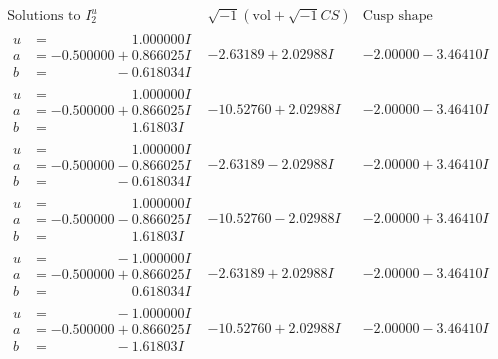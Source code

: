 \documentclass[1p]{elsarticle_modified}
\theoremstyle{definition}
\newcommand{\I}{\sqrt{-1}}
\begin{document}
$$\begin{array}{c|c|c}  
\text{Solutions to }I^u_{2}& \I (\text{vol} + \sqrt{-1}CS) & \text{Cusp shape}\\
 \hline 
\begin{aligned}
u &= \phantom{-0.000000 -}1.000000 I \\
a &= -0.500000 + 0.866025 I \\
b &= \phantom{-0.000000 } -0.618034 I\end{aligned}
 & -2.63189 + 2.02988 I & -2.00000 - 3.46410 I \\ \hline\begin{aligned}
u &= \phantom{-0.000000 -}1.000000 I \\
a &= -0.500000 + 0.866025 I \\
b &= \phantom{-0.000000 -}1.61803 I\end{aligned}
 & -10.52760 + 2.02988 I & -2.00000 - 3.46410 I \\ \hline\begin{aligned}
u &= \phantom{-0.000000 -}1.000000 I \\
a &= -0.500000 - 0.866025 I \\
b &= \phantom{-0.000000 } -0.618034 I\end{aligned}
 & -2.63189 - 2.02988 I & -2.00000 + 3.46410 I \\ \hline\begin{aligned}
u &= \phantom{-0.000000 -}1.000000 I \\
a &= -0.500000 - 0.866025 I \\
b &= \phantom{-0.000000 -}1.61803 I\end{aligned}
 & -10.52760 - 2.02988 I & -2.00000 + 3.46410 I \\ \hline\begin{aligned}
u &= \phantom{-0.000000 } -1.000000 I \\
a &= -0.500000 + 0.866025 I \\
b &= \phantom{-0.000000 -}0.618034 I\end{aligned}
 & -2.63189 + 2.02988 I & -2.00000 - 3.46410 I \\ \hline\begin{aligned}
u &= \phantom{-0.000000 } -1.000000 I \\
a &= -0.500000 + 0.866025 I \\
b &= \phantom{-0.000000 } -1.61803 I\end{aligned}
 & -10.52760 + 2.02988 I & -2.00000 - 3.46410 I \\ \hline\begin{aligned}

\end{aligned}
\end{array}$$
\end{document}
